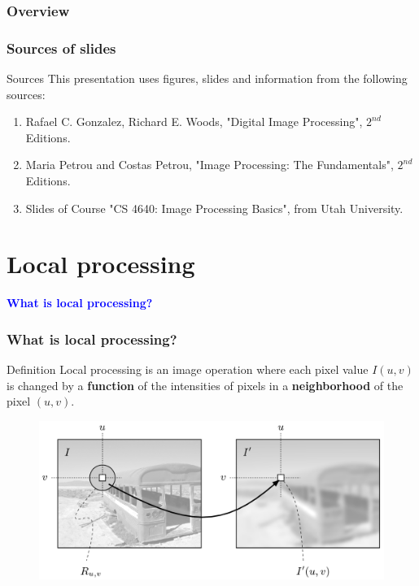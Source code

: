 \documentclass[english,11pt,table,handout]{beamer}
\date{09 September 2015}
\begin{document}
\begin{frame}
  \maketitle
\end{frame}

\begin{frame}\frametitle<presentation>{Overview}
  \tableofcontents
\end{frame}

\frame
{
	\frametitle{Sources of slides}
	\begin{alertblock}{Sources}
		This presentation uses figures, slides and information from the following sources:
		\begin{enumerate}
			\item Rafael C. Gonzalez, Richard E. Woods, "Digital Image Processing", $2^{nd}$ Editions.
			\item Maria Petrou and Costas Petrou, "Image Processing: The Fundamentals", $2^{nd}$ Editions.
			\item Slides of Course "CS 4640: Image Processing Basics", from Utah University.
		\end{enumerate}
	
	\end{alertblock}
}
\section{Local processing}
\frame
{
	\Huge
	\begin{center}
	\textcolor{blue}{\textbf{What is local processing?}}
	\end{center}
}

\frame
{
  \frametitle{What is local processing?}
	\begin{block}{Definition}
		Local processing is an image operation where each pixel value $I(u, v)$ is changed by a \alert{\textbf{function}} of the intensities of pixels in a \alert{\textbf{neighborhood}} of the pixel $(u, v)$.
	\end{block}
		
	\begin{figure}[!h]
   	\includegraphics[scale=0.5]{localproc.png}
	\end{figure}
}
\end{document}
